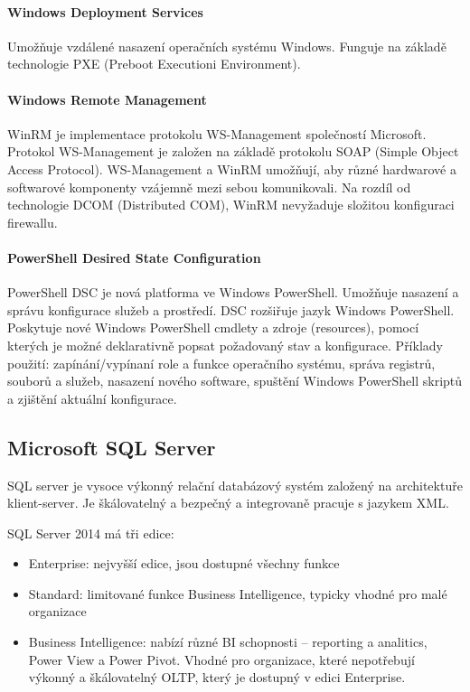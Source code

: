 \paragraph{Windows Deployment Services} 
Umožňuje vzdálené nasazení operačních systému Windows. Funguje na základě technologie PXE (Preboot Executioni Environment). \cite{MasteringWindowsServer}

\paragraph{Windows Remote Management}
WinRM je implementace protokolu WS-Management společností Microsoft. Protokol WS-Management je založen na základě protokolu SOAP (Simple Object Access Protocol). WS-Management a WinRM umožňují, aby různé hardwarové a softwarové komponenty vzájemně mezi sebou komunikovali. Na rozdíl od technologie DCOM (Distributed COM), WinRM nevyžaduje složitou konfiguraci firewallu. \cite{MasteringWindowsServer}

\paragraph{PowerShell Desired State Configuration}
PowerShell DSC je nová platforma ve Windows PowerShell. Umožňuje nasazení a správu konfigurace služeb a prostředí. DSC rozšiřuje jazyk Windows PowerShell. Poskytuje nové Windows PowerShell cmdlety a zdroje (resources), pomocí kterých je možné deklarativně popsat požadovaný stav a konfigurace. Příklady použití: zapínání/vypínaní role a funkce operačního systému, správa registrů, souborů a služeb, nasazení nového software, spuštění Windows PowerShell skriptů a zjištění aktuální konfigurace. \cite{dsc}

\subsection{Microsoft SQL Server}
SQL server je vysoce výkonný relační databázový systém založený na architektuře klient-server. Je škálovatelný a bezpečný a integrovaně pracuje s jazykem XML. 

SQL Server 2014 má tři edice:
\begin{itemize}
\item Enterprise: nejvyšší edice, jsou dostupné všechny funkce
\item Standard: limitované funkce Business Intelligence, typicky vhodné pro malé organizace
\item Business Intelligence: nabízí různé BI schopnosti -- reporting a analitics, Power View a Power Pivot. Vhodné pro organizace, které nepotřebují výkonný a škálovatelný OLTP, který je dostupný v edici Enterprise.
\end{itemize}

